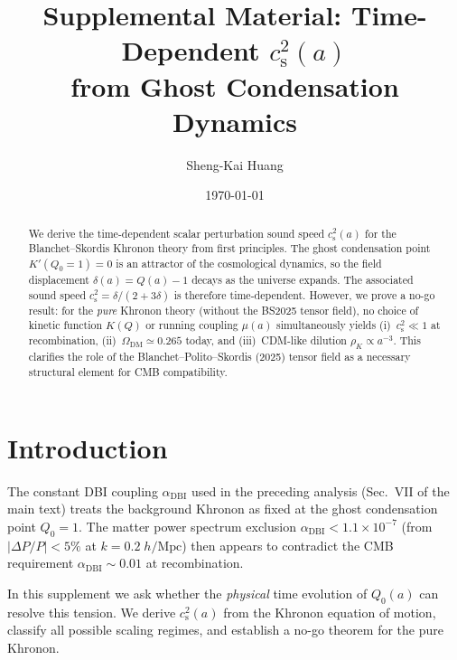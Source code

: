 \documentclass[prd,twocolumn,superscriptaddress,longbibliography,floatfix]{revtex4-2}
\newcommand{\cs}{c_{\mathrm{s}}}
\begin{document}
\title{Supplemental Material: Time-Dependent $\cs^2(a)$\\
from Ghost Condensation Dynamics}

\author{Sheng-Kai Huang}

\date{\today}

\begin{abstract}
We derive the time-dependent scalar perturbation sound speed
$\cs^2(a)$ for the Blanchet--Skordis Khronon theory from first
principles.  The ghost condensation point $K'(Q_0{=}1) = 0$
is an attractor of the cosmological dynamics, so the field
displacement $\delta(a) = Q(a) - 1$ decays as the universe
expands.  The associated sound speed
$\cs^2 = \delta/(2{+}3\delta)$ is therefore time-dependent.
However, we prove a no-go result: for the \emph{pure}
Khronon theory (without the BS2025 tensor field), no choice
of kinetic function $K(Q)$ or running coupling $\mu(a)$
simultaneously yields (i)~$\cs^2 \ll 1$ at recombination,
(ii)~$\Omega_{\mathrm{DM}} \simeq 0.265$ today, and
(iii)~CDM-like dilution $\rho_K \propto a^{-3}$.
This clarifies the role of the Blanchet--Polito--Skordis
(2025) tensor field as a necessary structural element for
CMB compatibility.
\end{abstract}

\maketitle


\section{Introduction}
\label{sec:intro}

The constant DBI coupling $\alpha_{\mathrm{DBI}}$ used in
the preceding analysis (Sec.~VII of the main text) treats
the background Khronon as fixed at the ghost condensation
point $Q_0 = 1$.  The matter power spectrum exclusion
$\alpha_{\mathrm{DBI}} < 1.1 \times 10^{-7}$ (from
$|\Delta P/P| < 5\%$ at $k = 0.2\;h/\mathrm{Mpc}$) then
appears to contradict the CMB requirement
$\alpha_{\mathrm{DBI}} \sim 0.01$ at recombination.

In this supplement we ask whether the \emph{physical}
time evolution of $Q_0(a)$ can resolve this tension.  We
derive $\cs^2(a)$ from the Khronon equation of motion,
classify all possible scaling regimes, and establish a
no-go theorem for the pure Khronon.
\end{document}
